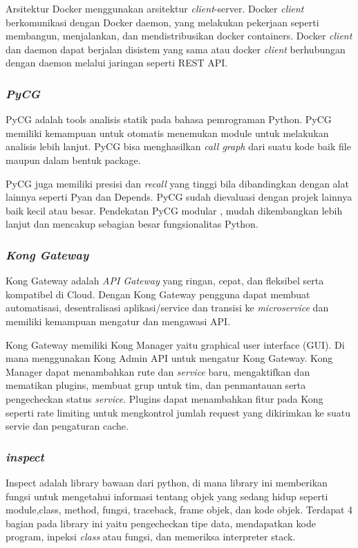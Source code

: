 Arsitektur Docker menggunakan arsitektur \textit{client}-server. Docker \textit{client} berkomunikasi dengan Docker daemon, yang melakukan pekerjaan seperti membangun, menjalankan, dan mendistribusikan docker containers. Docker \textit{client} dan daemon dapat berjalan disistem yang sama atau docker \textit{client} berhubungan dengan daemon melalui jaringan seperti REST API. 
\\
\subsubsection{\textit{PyCG} \cite{AD7}}
PyCG adalah tools analisis statik pada bahasa pemrograman Python. PyCG memiliki kemampuan untuk otomatis menemukan module untuk melakukan analisis lebih lanjut. PyCG bisa menghasilkan \textit{call graph} dari suatu kode baik file maupun dalam bentuk package.

PyCG juga memiliki presisi dan \textit{recall} yang tinggi bila dibandingkan dengan alat lainnya seperti Pyan dan Depends. PyCG sudah dievaluasi dengan projek lainnya baik kecil atau besar. Pendekatan PyCG modular , mudah dikembangkan lebih lanjut dan mencakup sebagian besar fungsionalitas Python.
\\
\subsubsection{\textit{Kong Gateway} \cite{kong}}
Kong Gateway adalah \textit{API Gateway} yang ringan, cepat, dan fleksibel serta kompatibel di Cloud. Dengan Kong Gateway pengguna dapat membuat automatisasi, desentralisasi aplikasi/service dan transisi ke \textit{microservice} dan memiliki kemampuan mengatur dan mengawasi API.

Kong Gateway memiliki Kong Manager yaitu graphical user interface (GUI). Di mana menggunakan Kong Admin API untuk mengatur Kong Gateway. Kong Manager dapat menambahkan rute dan \textit{service} baru, mengaktifkan dan mematikan plugins, membuat grup untuk tim, dan penmantauan serta pengecheckan status \textit{service}. Plugins dapat menambahkan fitur pada Kong seperti rate limiting untuk mengkontrol jumlah request yang dikirimkan ke suatu servie dan pengaturan cache.
\\
\subsubsection{\textit{inspect} \cite{inspect}}
Inspect adalah library bawaan dari python, di mana library ini memberikan fungsi untuk mengetahui informasi tentang objek yang sedang hidup seperti module,class, method, fungsi, traceback, frame objek, dan kode objek. Terdapat 4 bagian pada library ini yaitu pengecheckan tipe data, mendapatkan kode program, inpeksi \textit{class} atau fungsi, dan memeriksa interpreter stack.

